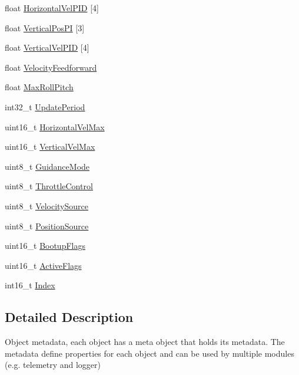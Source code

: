 \begin{DoxyCompactItemize}
\item 
float \hyperlink{struct____attribute_____a807fbf2b692eb5983404e1c071e155b7}{\-Horizontal\-Vel\-P\-I\-D} \mbox{[}4\mbox{]}
\item 
float \hyperlink{struct____attribute_____adfde66ef386f1e69693430e3c38170d1}{\-Vertical\-Pos\-P\-I} \mbox{[}3\mbox{]}
\item 
float \hyperlink{struct____attribute_____aa633dd07f6e1c5b17ed7ccc9dd5645a7}{\-Vertical\-Vel\-P\-I\-D} \mbox{[}4\mbox{]}
\item 
float \hyperlink{struct____attribute_____a9e2884654ba2699184d8c8a1c9af28c9}{\-Velocity\-Feedforward}
\item 
float \hyperlink{struct____attribute_____a8a5b50d3ba4507a943e66a856903112b}{\-Max\-Roll\-Pitch}
\item 
int32\-\_\-t \hyperlink{struct____attribute_____a155e7fc093cbb5aae13739e0fd103a01}{\-Update\-Period}
\item 
uint16\-\_\-t \hyperlink{struct____attribute_____ab3a0201d679bed158db23a5da5b35541}{\-Horizontal\-Vel\-Max}
\item 
uint16\-\_\-t \hyperlink{struct____attribute_____af2f30e88440c480a0444e4f7f5671d11}{\-Vertical\-Vel\-Max}
\item 
uint8\-\_\-t \hyperlink{struct____attribute_____aa0f37e1b7770dd8db7cf3baaa07e1174}{\-Guidance\-Mode}
\item 
uint8\-\_\-t \hyperlink{struct____attribute_____a42d632eab7a71f9666a81dfb4bc463e5}{\-Throttle\-Control}
\item 
uint8\-\_\-t \hyperlink{struct____attribute_____a34884fadde4fcaea636ad6f09e7ef998}{\-Velocity\-Source}
\item 
uint8\-\_\-t \hyperlink{struct____attribute_____ab0b1e986cf8d902d0183126f3b439918}{\-Position\-Source}
\item 
uint16\-\_\-t \hyperlink{struct____attribute_____a49d1685ee043a9bb4a84efe65c7d02a5}{\-Bootup\-Flags}
\item 
uint16\-\_\-t \hyperlink{struct____attribute_____a93c0cac2ad73bb855a03ca53609e51e1}{\-Active\-Flags}
\item 
int16\-\_\-t \hyperlink{struct____attribute_____a6ec957682da0359d711b1c56dcec5428}{\-Index}
\end{DoxyCompactItemize}


\subsection{\-Detailed \-Description}
\-Object metadata, each object has a meta object that holds its metadata. \-The metadata define properties for each object and can be used by multiple modules (e.\-g. telemetry and logger)

